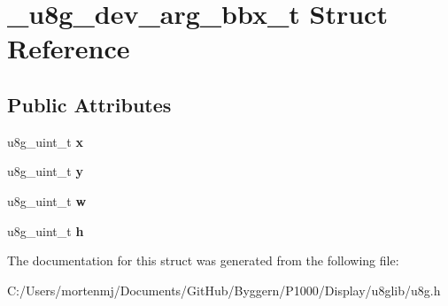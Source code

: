 \hypertarget{struct__u8g__dev__arg__bbx__t}{\section{\-\_\-u8g\-\_\-dev\-\_\-arg\-\_\-bbx\-\_\-t Struct Reference}
\label{struct__u8g__dev__arg__bbx__t}
}
\subsection*{Public Attributes}
\begin{DoxyCompactItemize}
\item 
\hypertarget{struct__u8g__dev__arg__bbx__t_a5855c38fb8c7d14fb48fbc1c34a38d95}{u8g\-\_\-uint\-\_\-t {\bfseries x}}\label{struct__u8g__dev__arg__bbx__t_a5855c38fb8c7d14fb48fbc1c34a38d95}

\item 
\hypertarget{struct__u8g__dev__arg__bbx__t_acbd3c53a46d235ba3bbd8a4ad6dc33aa}{u8g\-\_\-uint\-\_\-t {\bfseries y}}\label{struct__u8g__dev__arg__bbx__t_acbd3c53a46d235ba3bbd8a4ad6dc33aa}

\item 
\hypertarget{struct__u8g__dev__arg__bbx__t_a70cc8432220532a8e3de66a25bd3d052}{u8g\-\_\-uint\-\_\-t {\bfseries w}}\label{struct__u8g__dev__arg__bbx__t_a70cc8432220532a8e3de66a25bd3d052}

\item 
\hypertarget{struct__u8g__dev__arg__bbx__t_aa804ffd03c1b566f7691edd37c251852}{u8g\-\_\-uint\-\_\-t {\bfseries h}}\label{struct__u8g__dev__arg__bbx__t_aa804ffd03c1b566f7691edd37c251852}

\end{DoxyCompactItemize}


The documentation for this struct was generated from the following file\-:\begin{DoxyCompactItemize}
\item 
C\-:/\-Users/mortenmj/\-Documents/\-Git\-Hub/\-Byggern/\-P1000/\-Display/u8glib/u8g.\-h\end{DoxyCompactItemize}
